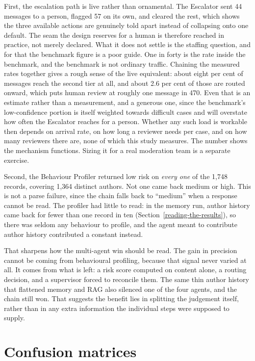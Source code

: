 First, the escalation path is live rather than ornamental. The Escalator sent 44 messages to a person, flagged 57 on its own, and cleared the rest, which shows the three available actions are genuinely told apart instead of collapsing onto one default. The seam the design reserves for a human is therefore reached in practice, not merely declared. What it does not settle is the staffing question, and for that the benchmark figure is a poor guide. One in forty is the rate inside the benchmark, and the benchmark is not ordinary traffic. Chaining the measured rates together gives a rough sense of the live equivalent: about eight per cent of messages reach the second tier at all, and about 2.6 per cent of those are routed onward, which puts human review at roughly one message in 470. Even that is an estimate rather than a measurement, and a generous one, since the benchmark's low-confidence portion is itself weighted towards difficult cases and will overstate how often the Escalator reaches for a person. Whether any such load is workable then depends on arrival rate, on how long a reviewer needs per case, and on how many reviewers there are, none of which this study measures. The number shows the mechanism functions. Sizing it for a real moderation team is a separate exercise.

Second, the Behaviour Profiler returned low risk on \emph{every one} of the 1,748 records, covering 1,364 distinct authors. Not one came back medium or high. This is not a parse failure, since the chain falls back to ``medium'' when a response cannot be read. The profiler had little to read: in the memory run, author history came back for fewer than one record in ten (Section~\ref{reading-the-results}), so there was seldom any behaviour to profile, and the agent meant to contribute author history contributed a constant instead.

That sharpens how the multi-agent win should be read. The gain in precision cannot be coming from behavioural profiling, because that signal never varied at all. It comes from what is left: a risk score computed on content alone, a routing decision, and a supervisor forced to reconcile them. The same thin author history that flattened memory and RAG also silenced one of the four agents, and the chain still won. That suggests the benefit lies in splitting the judgement itself, rather than in any extra information the individual steps were supposed to supply.

\section{Confusion matrices}\label{confusion-matrices}

